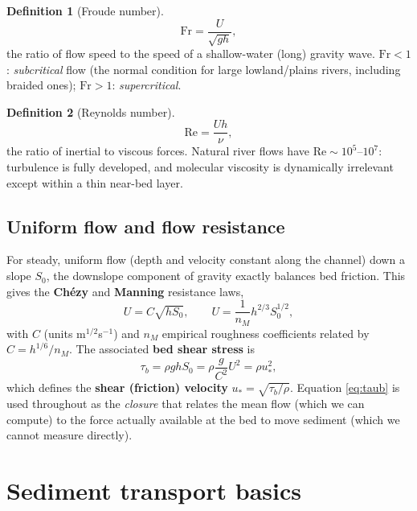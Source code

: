 \documentclass[11pt,a4paper]{report}
\theoremstyle{definition}
\newtheorem{definition}{Definition}[chapter]
\theoremstyle{plain}
\theoremstyle{remark}
\newcommand{\Fr}{\mathrm{Fr}}
\renewcommand{\Re}{\mathrm{Re}}
\begin{document}
\begin{definition}[Froude number]
\begin{equation}
\Fr = \frac{U}{\sqrt{gh}},
\end{equation}
the ratio of flow speed to the speed of a shallow-water (long) gravity wave. $\Fr<1$: \emph{subcritical} flow (the normal condition for large lowland/plains rivers, including braided ones); $\Fr>1$: \emph{supercritical}.
\end{definition}

\begin{definition}[Reynolds number]
\begin{equation}
\Re = \frac{Uh}{\nu},
\end{equation}
the ratio of inertial to viscous forces. Natural river flows have $\Re\sim10^5$--$10^7$: turbulence is fully developed, and molecular viscosity is dynamically irrelevant except within a thin near-bed layer.
\end{definition}

\subsection{Uniform flow and flow resistance}
For steady, uniform flow (depth and velocity constant along the channel) down a slope $S_0$, the downslope component of gravity exactly balances bed friction. This gives the \textbf{Chézy} and \textbf{Manning} resistance laws,
\begin{equation}
U = C\sqrt{h S_0}, \qquad U = \frac{1}{n_M}h^{2/3}S_0^{1/2},
\label{eq:chezy}
\end{equation}
with $C$ (units m$^{1/2}$s$^{-1}$) and $n_M$ empirical roughness coefficients related by $C = h^{1/6}/n_M$. The associated \textbf{bed shear stress} is
\begin{equation}
\tau_b = \rho g h S_0 = \rho \frac{g}{C^2}U^2 = \rho u_*^2,
\label{eq:taub}
\end{equation}
which defines the \textbf{shear (friction) velocity} $u_*=\sqrt{\tau_b/\rho}$. Equation \eqref{eq:taub} is used throughout as the \emph{closure} that relates the mean flow (which we can compute) to the force actually available at the bed to move sediment (which we cannot measure directly).

\section{Sediment transport basics}
\end{document}
